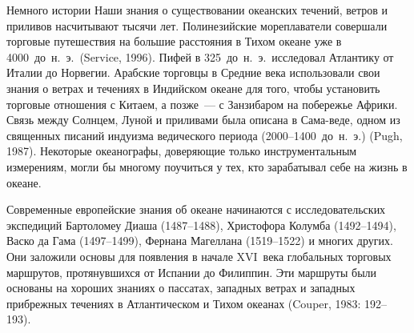
\begin{chapter}{Немного истории}
Наши знания о существовании океанских течений, ветров и приливов
насчитывают тысячи лет. Полинезийские мореплаватели совершали торговые
путешествия на большие расстояния в Тихом океане уже 
в 4000~до~н.~э.\ (Service, 1996). Пифей в 325~до~н.~э.\ исследовал Атлантику
от Италии до Норвегии. Арабские торговцы в Средние века использовали
свои знания о ветрах и течениях в Индийском океане для того, чтобы
установить торговые отношения с Китаем, а позже~--- с Занзибаром на
побережье Африки. Связь между Солнцем, Луной и приливами была
описана в Сама-веде, одном из священных писаний индуизма ведического 
периода (2000--1400~до~н.~э.) (Pugh, 1987). Некоторые океанографы, 
доверяющие только инструментальным измерениям, могли бы многому
поучиться у тех, кто зарабатывал себе на жизнь в океане.
%

Современные европейские знания об океане начинаются с
исследовательских экспедиций Бартоломеу Диаша (1487--1488), Христофора
Колумба (1492--1494), Васко да Гама (1497--1499), Фернана
Магеллана (1519--1522) и многих других. Они заложили
основы для появления в начале XVI~века глобальных торговых маршрутов,
протянувшихся от Испании до Филиппин. Эти маршруты были основаны на
хороших знаниях о пассатах, западных ветрах и западных прибрежных
течениях в Атлантическом и Тихом океанах (Couper, 1983: 192--193).
%


\end{chapter}
